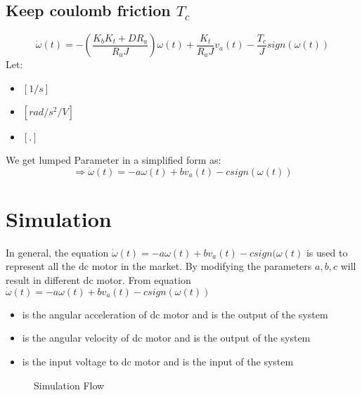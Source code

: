 \subsection{Keep coulomb friction \(T_c\)}
\begin{tcolorbox}[title=Lumped Parameters with Friction]
	\begin{equation}
		\dot{\omega}(t) = - (\frac{K_b K_t + D R_a}{R_a J})\omega(t) + \frac{K_t}{R_a J}v_a(t) - \frac{T_c}{J}sign(\omega(t))
		\label{dcmotoreq13}
	\end{equation}
	Let:
	\begin{itemize}
		\item { \([1/s]\) }
		\item { \([rad/s^2/V]\) }
		\item { \([.]\) }
	\end{itemize}
	We get lumped Parameter in a simplified form as:
	\begin{equation}
		\Rightarrow \dot{\omega}(t) = - a\omega(t) + bv_a(t) - csign(\omega(t))
		\label{dcmotoreq14}
	\end{equation}
\end{tcolorbox}


\section{Simulation}

In general, the equation \(\dot{\omega}(t) = - a\omega(t) + bv_a(t) - csign(\omega(t)\) is used to represent all the dc motor in the market. By modifying the parameters \(a, b, c\) will result in different dc motor.
From equation \(\dot{\omega}(t) = - a\omega(t) + bv_a(t) - csign(\omega(t))\)
\begin{itemize}
	\item { is the angular acceleration of dc motor and is the output of the system}
	\item { is the angular velocity of dc motor and is the output of the system}
	\item { is the input voltage to dc motor and is the input of the system}
\end{itemize}

\begin{figure}[h]
	\centering
	
	
	\caption{Simulation Flow}
	\label{fig:Simulation Flow}
\end{figure}


